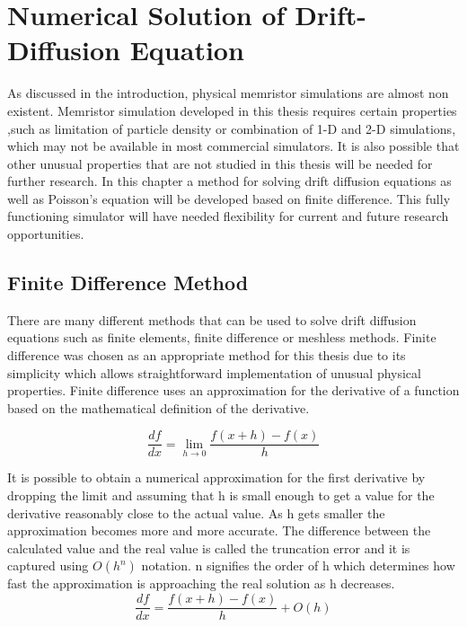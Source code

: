 

\chapter{Numerical Solution of Drift-Diffusion Equation} %

\label{Chapter3} %

\begin{doublespace}


As discussed in the introduction, physical memristor simulations are almost non existent. Memristor simulation developed in this thesis requires certain properties ,such as limitation of particle density or combination of 1-D and 2-D simulations, which may not be available in most commercial simulators. It is also possible that other unusual properties that are not studied in this thesis will be needed for further research. In this chapter a method for solving drift diffusion equations as well as Poisson's equation will be developed based on finite difference. This fully functioning simulator will have needed flexibility for current and future research opportunities.  


\section{Finite Difference Method}
There are many different methods that can be used to solve drift diffusion equations such as finite elements, finite difference or meshless methods. Finite difference was chosen as an appropriate method for this thesis due to its simplicity which allows straightforward implementation of unusual physical properties. Finite difference uses an approximation for the derivative of a function based on the mathematical definition of the derivative.

\begin{equation}
\frac{df}{dx}=\lim\limits_{h \rightarrow 0} \frac{f(x+h)-f(x)}{h}
\end{equation}

It is possible to obtain a numerical approximation for the first derivative by dropping the limit and assuming that h is small enough to get a value for the derivative reasonably close to the actual value. As h gets smaller the approximation becomes more and more accurate. The difference between the calculated value and the real value is called the truncation error and it is captured using $O(h^n)$ notation. n signifies the order of h which determines how fast the approximation is approaching the real solution as h decreases.  
\begin{equation}
\frac{df}{dx}=\frac{f(x+h)-f(x)}{h} + O(h)
\label{numdif}
\end{equation}


\end{doublespace}
